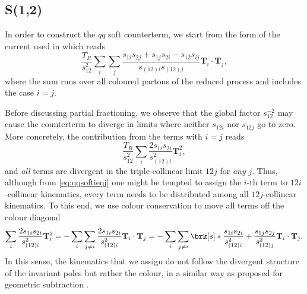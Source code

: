 \documentclass[11pt,a4paper]{article}
\newcommand{\colorT}[1]{\mathbf{T}_{#1}}
\begin{document}
\subsection{S(1,2)}

In order to construct the $q\bar{q}$ soft counterterm,
we start from the form of the current used in \cite{Somogyi:2005xz} which reads
\begin{equation}
	\frac{T_R}{s_{12}^2} \sum_i \sum_j
	\frac{s_{1i}s_{2j} + s_{1j}s_{2i} - s_{12}s_{ij}}{s_{(12)i} s_{(12)j}}
	\colorT{i}\cdot\colorT{j},
\end{equation}
where the sum runs over all coloured partons of the reduced process
and includes the case $i=j$.

Before discussing partial fractioning, we observe
that the global factor $s_{12}^{-2}$ may cause the counterterm to diverge
in limits where neither $s_{12i}$ nor $s_{12j}$ go to zero.
More concretely, the contribution from the terms with $i=j$ reads
\begin{equation}
\label{eq:qqsoftieqj}
	\frac{T_R}{s_{12}^2} \sum_{i}
	\frac{2s_{1i}s_{2i}}{s_{(12)i}^2}
	\colorT{i}^2,
\end{equation}
and \emph{all} terms are divergent in the triple-collinear limit $12j$
for \emph{any} $j$.
Thus, although from \cref{eq:qqsoftieqj} one might be tempted
to assign the $i$-th term to $12i$-collinear kinematics,
every term needs to be distributed among all $12j$-collinear kinematics.
To this end, we use colour conservation to move all terms off the colour diagonal
\begin{equation}
	\sum_{i}
	\frac{2s_{1i}s_{2i}}{s_{(12)i}^2}
	\colorT{i}^2
	= - \sum_i \sum_{j\ne i}
	\frac{2s_{1i}s_{2i}}{s_{(12)i}^2}
	\colorT{i}\cdot\colorT{j}
	= - \sum_i \sum_{j\ne i} \brk[s]*{
	\frac{s_{1i}s_{2i}}{s_{(12)i}^2}
	+ \frac{s_{1j}s_{2j}}{s_{(12)j}^2}
	}
	\colorT{i}\cdot\colorT{j}.
\end{equation}
In this sense, the kinematics that we assign do not follow the divergent structure
of the invariant poles but rather the colour,
in a similar way as proposed for geometric subtraction \cite{Herzog:2018ggi}.
\end{document}
